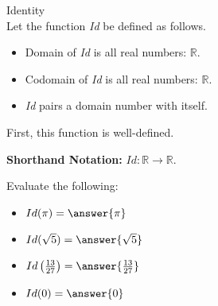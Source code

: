 \documentclass{ximera}
\begin{document}
\begin{example} Identity \\

Let the function \textit{Id} be defined as follows.


\begin{itemize}
\item Domain of \textit{Id} is all real numbers: $\mathbb{R}$.
\item Codomain of \textit{Id} is all real numbers: $\mathbb{R}$.
\item \textit{Id} pairs a domain number with itself.
\end{itemize}


First, this function is well-defined.


\textbf{Shorthand Notation: } $Id: \mathbb{R} \rightarrow \mathbb{R}$.

\begin{question}
Evaluate the following:

\begin{itemize}
	\item $Id(\pi) = \answer{\pi}$
	\item $Id(\sqrt{5}) = \answer{\sqrt{5}}$
	\item $Id\left(\frac{13}{27}\right) = \answer{\frac{13}{27}}$
	\item $Id(0) = \answer{0}$
\end{itemize}

\end{question}

\end{example}
\end{document}
